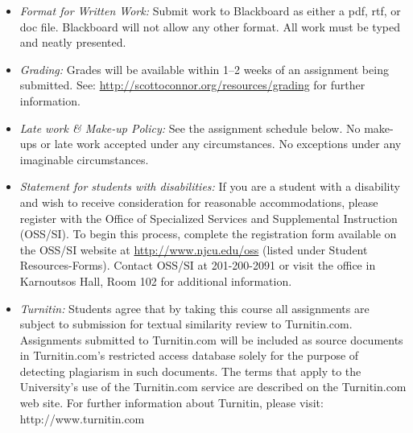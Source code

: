 \documentclass[article,oneside]{memoir}
\begin{document}
\begin{itemize}
\item \textit{Format for Written Work:} Submit work to Blackboard as either a pdf, rtf, or doc file. Blackboard will not allow any other format. All work must be typed and neatly presented. 



\item \textit{Grading:} Grades will be available within 1--2 weeks of an assignment being submitted. See: \href{http://scottoconnor.org/resources/grading}{http://scottoconnor.org/resources/grading} for further information.


\item \textit{Late work \& Make-up Policy:} See the assignment schedule below. No make-ups or late work accepted under any circumstances. No exceptions under any imaginable circumstances.

\item \textit{Statement for students with disabilities:} If you are a student
with a disability and wish to receive consideration for reasonable
accommodations, please register with the Office of Specialized Services
and Supplemental Instruction (OSS/SI). To begin this process, complete
the registration form available on the OSS/SI website at
\href{http://www.njcu.edu/oss}{http://www.njcu.edu/oss}
(listed under Student Resources-Forms). Contact OSS/SI at 201-200-2091
or visit the office in Karnoutsos Hall, Room 102 for additional
information.

\item \textit{Turnitin:} Students agree that by taking this course all assignments are subject to submission for textual similarity review to Turnitin.com. Assignments submitted to Turnitin.com will be included as source documents in Turnitin.com's restricted access database solely for the purpose of detecting plagiarism in such documents.  The terms that apply to the University’s use of the Turnitin.com service are described on the Turnitin.com web site.  For further information about Turnitin, please visit: http://www.turnitin.com 


\end{itemize}
\end{document}
